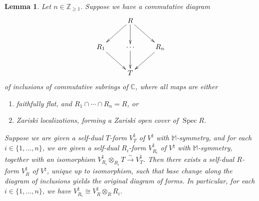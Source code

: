 \documentclass[11pt]{article}
\newcommand{\bC}{\mathbb{C}}
\newcommand{\bM}{\mathbb{M}}
\newcommand{\bZ}{\mathbb{Z}}
\DeclareMathOperator{\Spec}{Spec}
\newcommand{\simto}{\overset{\sim}{\to}}
\newtheorem{lem}[thm]{Lemma}
\theoremstyle{definition}
\begin{document}
\begin{lem} \label{lem:unique-R-forms-with-monster-symmetry} Let $n \in \bZ_{\geq 1}$. Suppose we have a commutative diagram
\begin{gather*} \xymatrix{ & R \ar[rd] \ar[ld] \ar[d] \\ R_1 \ar[rd] & \cdots \ar[d] & R_n \ar[ld] \\ & T} \end{gather*}
of inclusions of commutative subrings of $\bC$, where all maps are either
\begin{enumerate}\itemsep=0pt
\item[$1)$] faithfully flat, and $R_1 \cap \cdots \cap R_n = R$, or
\item[$2)$] Zariski localizations, forming a Zariski open cover of $\Spec R$.
\end{enumerate}
Suppose we are given a self-dual $T$-form $V^\natural_T$ of $V^\natural$ with $\bM$-symmetry, and for each $i \in \{1,\ldots,n\}$, we are given a self-dual $R_i$-form $V^\natural_{R_i}$ of $V^\natural$ with $\bM$-symmetry, together with an isomorphism $V^\natural_{R_i} \otimes_{R_i} T \simto V^\natural_T$. Then there exists a self-dual $R$-form $V^\natural_R$ of $V^\natural$, unique up to isomorphism, such that base change along the diagram of inclusions yields the original diagram of forms. In particular, for each $i \in \{1, \ldots, n\}$, we have $V^\natural_{R_i} \cong V^\natural_R \otimes_{R} R_i$.
\end{lem}
\end{document}
